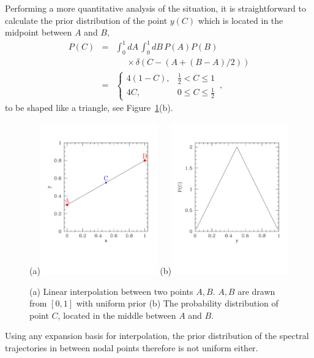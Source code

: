 \documentclass[a4paper,11pt]{article}
\begin{document}
Performing a more quantitative analysis of the situation, it is
straightforward to calculate the prior distribution of the point
$y(C)$ which is located in the midpoint between $A$ and $B$,
\begin{eqnarray}
  P(C)&=&\int_0^1\!d A\, \int_0^1\!d B\, P(A) P(B)\, \nonumber\\
  &&\phantom{bla}\times\delta\left(C-(A+(B-A)/2)\right) \nonumber\\
  &=&\left\{\begin{array}{ll}4(1-C), & \frac{1}{2}<C\le1\\4C,& 0\le C\le\frac{1}{2}\end{array}\right.\, ,\, 
\end{eqnarray}
to be shaped like a triangle, see Figure~\ref{fig:linear_prior}(b).
\begin{figure}
  \begin{center}
    (a)\includegraphics[width=0.45\textwidth]{fig_linear_prior_a}
    (b)\includegraphics[width=0.45\textwidth]{fig_linear_prior_b}
  \end{center}
  \caption[Prior effect of a linear interpolation]{(a) Linear
  interpolation between two points $A, B$. $A, B$ are drawn from
  $[0,1]$ with uniform prior (b) The probability distribution of point
  $C$, located in the middle between $A$ and $B$.}
  \label{fig:linear_prior}
\end{figure}
Using any expansion basis for interpolation, the prior distribution of
the spectral trajectories in between nodal points therefore is not
uniform either.
\end{document}
